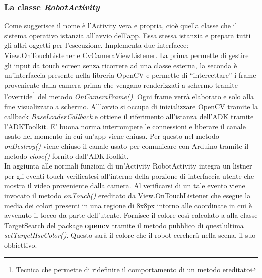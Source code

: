 \subsubsection{La classe \emph{RobotActivity}}
Come suggerisce il nome è l'Activity vera e propria, cioè quella classe che il 
sistema operativo istanzia all'avvio dell'app. Essa stessa istanzia e prepara tutti gli 
altri oggetti per l'esecuzione. Implementa due interfacce: View.OnTouchListener 
e CvCameraViewListener. 
La prima permette di gestire gli input da touch screen senza ricorrere ad una classe esterna,
la seconda è un'interfaccia presente nella libreria OpenCV e permette di ``intercettare''
i frame proveniente dalla camera prima che vengano renderizzati a schermo tramite 
l'override\footnote{Tecnica che permette di ridefinire il comportamento di un metodo 
ereditato} del metodo \textit{OnCameraFrame()}. Ogni frame verrà elaborato e solo alla
fine visualizzato a schermo.
All'avvio si occupa di inizializzare OpenCV tramite la 
callback \textit{BaseLoaderCallback} e ottiene il riferimento all'istanza dell'ADK
tramite l'ADKToolkit. E' buona norma interrompere le connessioni e liberare il canale usato 
nel momento in cui un'app viene chiusa. Per questo nel metodo \emph{onDestroy()} 
viene chiuso il canale usato per comunicare con Arduino tramite il metodo \emph{close()}
fornito dall'ADKToolkit.\\
In aggiunta alle normali funzioni di un'Activity RobotActivity integra un 
listner per gli eventi touch verificatesi all'interno della porzione di 
interfaccia utente che mostra il video proveniente dalla camera. Al verificarsi di un
tale evento viene invocato il metodo \emph{onTouch()} ereditato da View.OnTouchListener 
che esegue la media dei colori presenti in una regione di 8x8px intorno alle coordinate
in cui è avvenuto il tocco da parte dell'utente. Fornisce il colore così calcolato a 
alla classe TargetSearch del package \textbf{opencv} tramite il metodo pubblico 
di quest'ultima \emph{setTargetHsvColor()}. Questo sarà il colore che il robot cercherà
nella scena, il suo obbiettivo.

